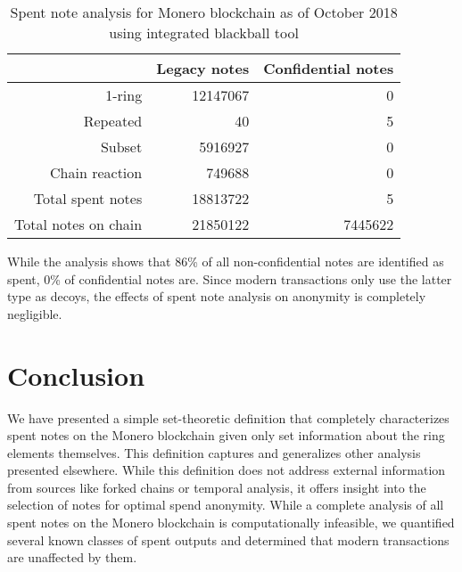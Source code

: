 \documentclass{mrl}
\begin{document}
\begin{table}[ht]
\begin{center}
\begin{tabular}{rrr}
& Legacy notes & Confidential notes \\
\hline
1-ring & 12147067 & 0 \\
Repeated & 40 & 5 \\
Subset & 5916927 & 0 \\
Chain reaction & 749688 & 0 \\
\hline
Total spent notes & 18813722 & 5 \\
Total notes on chain & 21850122 & 7445622 \\
\end{tabular}
\caption{Spent note analysis for Monero blockchain as of October 2018 using integrated blackball tool}
\label{table:spent}
\end{center}
\end{table}

While the analysis shows that 86\% of all non-confidential notes are identified as spent, 0\% of confidential notes are. Since modern transactions only use the latter type as decoys, the effects of spent note analysis on anonymity is completely negligible.

\section{Conclusion}
We have presented a simple set-theoretic definition that completely characterizes spent notes on the Monero blockchain given only set information about the ring elements themselves. This definition captures and generalizes other analysis presented elsewhere. While this definition does not address external information from sources like forked chains or temporal analysis, it offers insight into the selection of notes for optimal spend anonymity. While a complete analysis of all spent notes on the Monero blockchain is computationally infeasible, we quantified several known classes of spent outputs and determined that modern transactions are unaffected by them.
\end{document}
